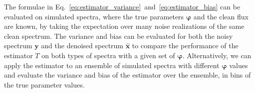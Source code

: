 \documentclass[twocolumn]{aastex7}
\newcommand{\ld}[1]{\textcolor{red}{\textbf{#1}}}
\newcommand{\m}[1]{\boldsymbol{#1}}
\begin{document}

The formulae in Eq.~\ref{eq:estimator_variance}~and~\ref{eq:estimator_bias} can be evaluated on simulated spectra, where the true parameters $\m{\varphi}$ and the clean flux are known, by taking the expectation over many noise realizations of the same clean spectrum. The variance and bias can be evaluated for both the noisy spectrum $\m{y}$ and the denoised spectrum $\hat{\m{x}}$ to compare the performance of the estimator $T$ on both types of spectra with a given set of $\m{\varphi}$. Alternatively, we can apply the estimator to an ensemble of simulated spectra with different $\m{\varphi}$ values and evaluate the variance and bias of the estimator over the ensemble, in bins of the true parameter values.
\end{document}
